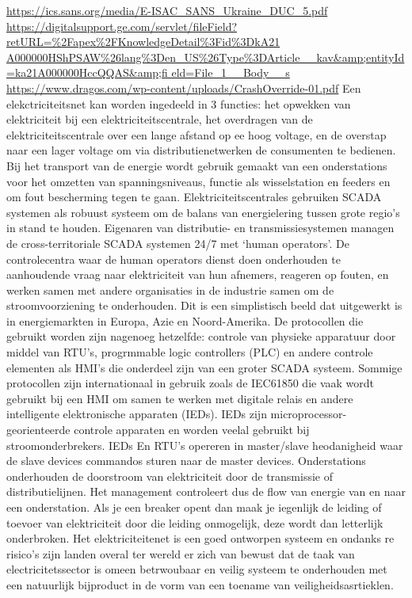 		
		\url{https://ics.sans.org/media/E-ISAC_SANS_Ukraine_DUC_5.pdf}
		\url{https://digitalsupport.ge.com/servlet/fileField?retURL=%
			A000000HShPSAW%
			eld=File_1__Body__s}
		\url{https://www.dragos.com/wp-content/uploads/CrashOverride-01.pdf}
		Een elekctriciteitsnet kan worden ingedeeld in 3 functies: het opwekken van elektriciteit bij een
		elektriciteitscentrale, het overdragen van de elektriciteitscentrale over een lange afstand op ee hoog
		voltage, en de overstap naar een lager voltage om via distributienetwerken de consumenten te
		bedienen. Bij het transport van de energie wordt gebruik gemaakt van een onderstations voor het
		omzetten van spanningsniveaus, functie als wisselstation en feeders en om fout bescherming tegen
		te gaan.
		Elektriciteitscentrales gebruiken SCADA systemen als robuust systeem om de balans van
		energielering tussen grote regio’s in stand te houden. Eigenaren van distributie- en
		transmissiesystemen managen de cross-territoriale SCADA systemen 24/7 met ‘human operators’.
		De controlecentra waar de human operators dienst doen onderhouden te aanhoudende vraag naar
		elektriciteit van hun afnemers, reageren op fouten, en werken samen met andere organisaties in de
		industrie samen om de stroomvoorziening te onderhouden.
		Dit is een simplistisch beeld dat uitgewerkt is in energiemarkten in Europa, Azie en Noord-Amerika.
		De protocollen die gebruikt worden zijn nagenoeg hetzelfde: controle van physieke apparatuur door
		middel van RTU’s, progrmmable logic controllers (PLC) en andere controle elementen als HMI’s die
		onderdeel zijn van een groter SCADA systeem. Sommige protocollen zijn internationaal in gebruik
		zoals de IEC61850 die vaak wordt gebruikt bij een HMI om samen te werken met digitale relais en
		andere intelligente elektronische apparaten (IEDs). IEDs zijn microprocessor-georienteerde controle
		apparaten en worden veelal gebruikt bij stroomonderbrekers. IEDs En RTU’s opereren in
		master/slave heodanigheid waar de slave devices commandos sturen naar de master devices.
		Onderstations onderhouden de doorstroom van elektriciteit door de transmissie of distributielijnen.
		Het management controleert dus de flow van energie van en naar een onderstation. Als je een
		breaker opent dan maak je iegenlijk de leiding of toevoer van elektriciteit door die leiding
		onmogelijk, deze wordt dan letterlijk onderbroken.
		Het elektriciteitenet is een goed ontworpen systeem en ondanks re risico’s zijn landen overal ter
		wereld er zich van bewust dat de taak van electricitetssector is omeen betrwoubaar en veilig systeem
		te onderhouden met een natuurlijk bijproduct in de vorm van een toename van veiligheidsasrtieklen.
		
